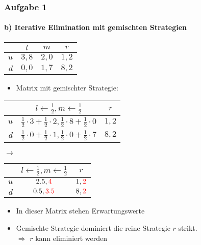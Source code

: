 \documentclass{beamer}
\begin{document}
\begin{frame}
	\frametitle{Aufgabe 1}
	\framesubtitle{b) Iterative Elimination mit gemischten Strategien}

	\centering
	\begin{tabular}{r|c|c|c|}
		& $l$ & $m$ & $r$ \\
		\hline
		$u$ & $3, 8$ & $2, 0$ & $1, 2$ \\
		$d$ & $0, 0$ & $1, 7$ & $8, 2$ \\
		\hline
	\end{tabular}

	\begin{itemize}
		\item Matrix mit gemischter Strategie:
	\end{itemize}

	\begin{tabular}{r|c|c|}
		& $l \leftarrow \frac{1}{2}, m \leftarrow \frac{1}{2} $& $r$ \\
		\hline
		$u$ & $\frac{1}{2} \cdot 3 + \frac{1}{2} \cdot 2, \frac{1}{2} \cdot 8 + \frac{1}{2} \cdot 0$ & $1, 2$ \\
		$d$ & $\frac{1}{2} \cdot 0 + \frac{1}{2} \cdot 1, \frac{1}{2} \cdot 0 + \frac{1}{2} \cdot 7$ & $8, 2$ \\
		\hline
	\end{tabular}
    $\rightarrow$    
	\begin{tabular}{r|c|c|}
		& $l \leftarrow \frac{1}{2}, m \leftarrow \frac{1}{2} $& $r$ \\
		\hline
		$u$ & $2.5, \textcolor{red}{4}$ & $1, \textcolor{red}{2}$ \\
		$d$ & $0.5, \textcolor{red}{3.5}$ & $8, \textcolor{red}{2}$ \\
		\hline
	\end{tabular}

	\begin{itemize}
		\item In dieser Matrix stehen Erwartungswerte
		\item Gemischte Strategie dominiert die reine Strategie $r$ strikt.\\
		$\Rightarrow$ $r$ kann eliminiert werden
	\end{itemize}

\end{frame}
\end{document}
